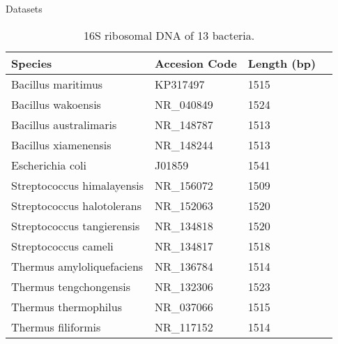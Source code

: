 \documentclass[10pt]{beamer}
\newcommand{\1}{
	\setbeamertemplate{background}{
		\texttt{[image: img/1\_dna]}
		\tikz[overlay] \fill[fill opacity=0.75,fill=white] (0,0) rectangle (-\paperwidth,\paperheight);
	}
}
\begin{document}
\begin{frame}{Datasets}
	\begin{table}[]
		\centering
		\caption{16S ribosomal DNA of 13 bacteria.}
		\label{tab:16sdb}
		\begin{tabular}{llll}
			\hline
			Species                         & Accesion Code & Length (bp) \\ \hline
			Bacillus       maritimus         & KP317497      & 1515        \\
			Bacillus       wakoensis         & NR\_040849    & 1524        \\
			Bacillus       australimaris     & NR\_148787    & 1513        \\
			Bacillus       xiamenensis       & NR\_148244    & 1513        \\
			Escherichia    coli              & J01859        & 1541        \\
			Streptococcus  himalayensis      & NR\_156072    & 1509        \\
			Streptococcus  halotolerans      & NR\_152063    & 1520        \\
			Streptococcus  tangierensis      & NR\_134818    & 1520        \\
			Streptococcus  cameli            & NR\_134817    & 1518        \\
			Thermus        amyloliquefaciens & NR\_136784    & 1514        \\
			Thermus        tengchongensis    & NR\_132306    & 1523        \\
			Thermus        thermophilus      & NR\_037066    & 1515        \\
			Thermus        filiformis        & NR\_117152    & 1514        \\ \hline
		\end{tabular} 
	\end{table}
\end{frame}
\end{document}
